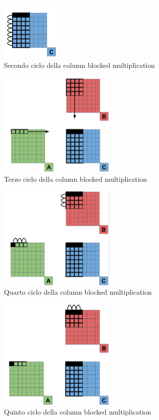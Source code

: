 \documentclass[conference]{IEEEtran}
\begin{document}
\begin{figure}
    \centering
    \includegraphics[width=0.25\textwidth]{resources/column_blocked_2.png}
    \caption{Secondo ciclo della column blocked multiplication}
    \label{fig:column_blocked_2}
\end{figure}
\begin{figure}
    \centering
    \includegraphics[width=0.5\textwidth]{resources/column_blocked_3.png}
    \caption{Terzo ciclo della column blocked multiplication}
    \label{fig:column_blocked_3}
\end{figure}
\begin{figure}
    \centering
    \includegraphics[width=0.5\textwidth]{resources/column_blocked_4.png}
    \caption{Quarto ciclo della column blocked multiplication}
    \label{fig:column_blocked_4}
\end{figure}
\begin{figure}
    \centering
    \includegraphics[width=0.5\textwidth]{resources/column_blocked_5.png}
    \caption{Quinto ciclo della column blocked multiplication}
    \label{fig:column_blocked_5}
\end{figure}
\end{document}
